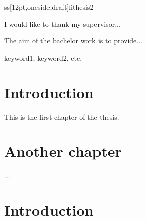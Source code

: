 ss[12pt,oneside,draft]{fithesis2}
\usepackage[english]{babel} %
\usepackage[cp1250]{inputenc} %
\usepackage[T1]{fontenc}
\usepackage[plainpages=false,pdfpagelabels,unicode]{hyperref}

\FrontMatter
\ThesisTitlePage
\begin{ThesisDeclaration}
\DeclarationText
\AdvisorName
\end{ThesisDeclaration}
\begin{ThesisThanks}
I would like to thank my supervisor...
\end{ThesisThanks}
\begin{ThesisAbstract}
The aim of the bachelor work is to provide...
\end{ThesisAbstract}
\begin{ThesisKeyWords}
keyword1, keyword2, etc.
\end{ThesisKeyWords}
\MainMatter
\chapter{Introduction}
This is the first chapter of the thesis.
\chapter{Another chapter}
...
\tableofcontents %
\chapter{Introduction} %

